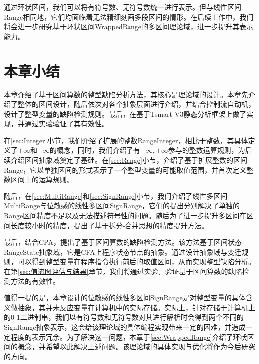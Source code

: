 通过环状区间，我们可以将有符号数、无符号数统一进行表示。但与线性区间Range相同地，它们均面临着无法精细刻画多段区间的情形。在后续工作中，我们将会进一步研究基于环状区间WrappedRange的多区间理论域，进一步提升其表示能力。

\section{本章小结}

本章介绍了基于区间算数的整型缺陷分析方法，其核心是理论域的设计。本章先介绍了整体的区间设计，随后依次对各个抽象层面进行介绍，并结合控制流自动机，设计了整型变量的缺陷检测规则。最后，在基于Tsmart-V3静态分析框架上做了实现，并通过实验验证了其有效性。

在\ref{sec:Integer}小节，我们介绍了扩展的整数RangeInteger，相比于整数，其具体定义了$ +\infty $和$ -\infty $的概念，同时，我们介绍了有$ -\infty, +\infty $参与的整数运算规则，为后续介绍区间抽象域奠定了基础。在\ref{sec:Range}小节，介绍了基于扩展整数的区间Range，它以单独区间的形式表示了一个整型变量的可能取值范围，并首次定义整数区间上的运算规则。

随后，在\ref{sec:MultiRange}和\ref{sec:SignRange}小节，我们介绍了线性多区间MultiRange与位敏感的线性多区间SignRange，它们的提出分别解决了单独的Range区间精度不足以及无法描述符号性的问题。随后为了进一步提升多区间在区间长度较小时的精度，提出了基于拆分-合并思想的精度提升方法。

最后，结合CPA，提出了基于区间算数的缺陷检测方法。该方法基于区间状态RangeState抽象域，它是CFA上程序状态节点的抽象。通过设计抽象域与变迁规则，可以得到整型变量在程序指令执行前后的取值区间，从而实现整型缺陷分析。在第\ref{sec:值流图评估与结果}章节，我们将通过实验，验证基于区间算数的缺陷检测方法的有效性。

值得一提的是，本章设计的位敏感的线性多区间SignRange是对整型变量的具体含义做抽象，其并未反应变量在计算机中的实际存储。实际上，针对存储于计算机上的0-1二进制串，我们以有符号数和无符号数对其进行解析时会得到两个不同的SignRange抽象表示，这会给该理论域的具体编程实现带来一定的困难，并造成一定程度的表示冗余。为了解决这一问题，本章于\ref{sec:WrappedRange}介绍了环状区间的概念，并希望以此解决上述问题。该理论域的具体实现与优化将作为今后研究的方向。




















































